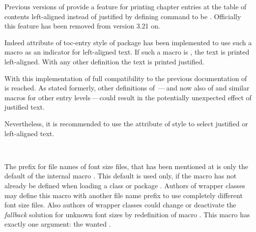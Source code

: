 \begin{Declaration}
\end{Declaration}
%
Previous versions of
\KOMAScript{} provide a feature for printing chapter entries at the table of
contents left-aligned instead of justified by defining command
 to be . Officially this feature
has been removed from \KOMAScript{} version 3.21 on.

Indeed attribute  of toc-entry style 
of package  has been implemented to
use such a macro  as an indicator for
left-aligned text. If such a macro is , the text is printed
left-aligned. With any other definition the text is printed justified.

With this implementation of  full compatibility to the
previous documentation of  is reached. As
stated formerly, other definitions of \,---\,and now
also of  and similar macros for other entry
levels\,---\,could result in the potentially unexpected effect of justified
text.

Nevertheless, it is recommended to use the attribute of style 
to select justified or left-aligned text.%



\begin{Declaration}
  \\
\end{Declaration}
%
%
The prefix  for file names of font size files, that has been
mentioned at
 is only the default of the
internal macro . This
default is used only, if the macro has not already be defined when loading a
\KOMAScript{} class or package . Authors of wrapper classes
may define this macro with another file name prefix to use completely
different font size files. Also authors of wrapper classes
could change or deactivate the \emph{fallback} solution for unknown font sizes
by redefinition of macro
. This macro has
exactly one argument: the wanted .%
%
%
%

